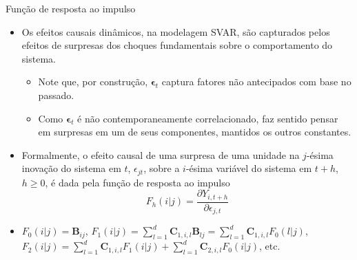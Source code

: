 \documentclass[11pt]{beamer}
\begin{document}
\begin{frame}{Função de resposta ao impulso}
	\begin{itemize}
		\item Os efeitos causais dinâmicos, na modelagem SVAR, são capturados pelos efeitos de surpresas dos choques fundamentais sobre o comportamento do sistema.
		\begin{itemize}
			\item Note que, por construção, $\boldsymbol{\epsilon}_t$ captura fatores não antecipados com base no passado. 
			\item Como $\boldsymbol{\epsilon}_t$ é não contemporaneamente correlacionado, faz sentido pensar em surpresas em um de seus componentes, mantidos os outros constantes.
	\end{itemize}
	\item Formalmente, o efeito causal de uma surpresa de uma unidade na $j$-ésima inovação do sistema em $t$, $\epsilon_{jt}$, sobre a $i$-ésima variável do sistema em $t+h$, $h\geq 0$, é dada pela {\color{blue}função de resposta ao impulso}
	$$F_{h}(i|j)  = \frac{\partial Y_{i,t+h}}{\partial \epsilon_{j,t}}$$
	\item  $F_{0}(i|j) = \boldsymbol{B}_{ij}$, $F_{1}(i|j) = \sum_{l=1}^d\boldsymbol{C}_{1, i,l} \boldsymbol{B}_{lj} = \sum_{l=1}^d\boldsymbol{C}_{1, i,l} F_{0}(l|j)$, $F_2(i|j) = \sum_{l=1}^d \boldsymbol{C}_{1, i,l} F_{1}(i|j) + \sum_{l=1}^d\boldsymbol{C}_{2, i,l} F_{0}(i|j)$, etc.
	\end{itemize}
\end{frame}
\end{document}
